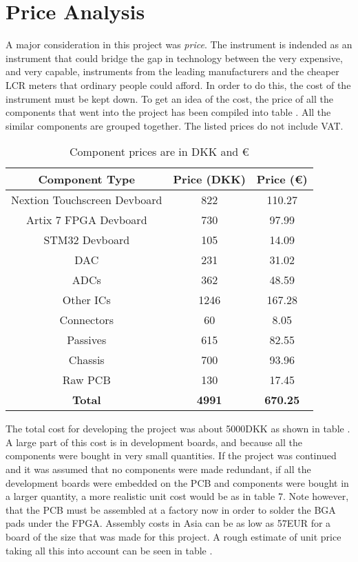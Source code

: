 \section{Price Analysis} \label{subsec:8_3_Cost}
A major consideration in this project was \textit{price}. The instrument is indended as an instrument that could bridge the gap in technology between the very expensive, and very capable, instruments from the leading manufacturers and the cheaper LCR meters that ordinary people could afford. In order to do this, the cost of the instrument must be kept down. To get an idea of the cost, the price of all the components that went into the project has been compiled into table . All the similar components are grouped together. The listed prices do not include VAT.

\begin{table}[H]
    \centering
    \renewcommand{\arraystretch}{1.5}
    \setlength{\tabcolsep}{8pt}
    \begin{tabular}{|c|c|c|}
    \hline
    \textbf{Component Type} & \textbf{Price (DKK)} & \textbf{Price (€)} \\ \hline
    Nextion Touchscreen Devboard & 822 & 110.27 \\ \hline
    Artix 7 FPGA Devboard & 730 & 97.99 \\ \hline
    STM32 Devboard & 105 & 14.09 \\ \hline
    DAC & 231 & 31.02 \\ \hline
    ADCs & 362 & 48.59 \\ \hline
    Other ICs & 1246 & 167.28 \\ \hline
    Connectors & 60 & 8.05 \\ \hline
    Passives & 615 & 82.55 \\ \hline
    Chassis & 700 & 93.96 \\ \hline
    Raw PCB & 130 & 17.45 \\ \hline
    \textbf{Total} & \textbf{4991} & \textbf{670.25} \\ \hline
    \end{tabular}
    \caption{Component prices are in DKK and €}
    \label{tab:ComponentTypeAndPrice}
\end{table}

The total cost for developing the project was about 5000DKK as shown in table . A large part of this cost is in development boards, and because all the components were bought in very small quantities. If the project was continued and it was assumed that no components were made redundant, if all the development boards were embedded on the PCB and components were bought in a larger quantity, a more realistic unit cost would be as in table 7. Note however, that the PCB must be assembled at a factory now in order to solder the BGA pads under the FPGA. Assembly costs in Asia can be as low as 57EUR for a board of the size that was made for this project. A rough estimate of unit price taking all this into account can be seen in table .

